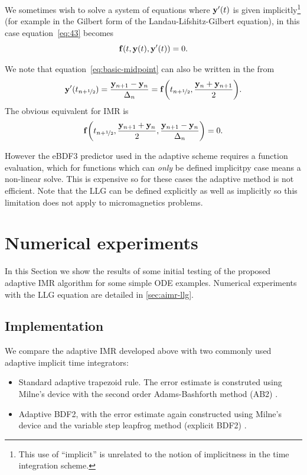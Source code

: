 We sometimes wish to solve a system of equations where $\mathbf{y}'(t)$ is given implicitly\footnote{This use of ``implicit'' is unrelated to the notion of implicitness in the time integration scheme.} (for example in the Gilbert form of the Landau-Lifshitz-Gilbert equation), in this case equation~\eqref{eq:43} becomes
\begin{equation}
  {\mathbf{f}{\left( t, \mathbf{y}(t), \mathbf{y}'(t) \right)}} = 0.
\end{equation}

We note that equation~\eqref{eq:basic-midpoint} can also be written in the from
\begin{equation}
  \mathbf{y}'(t_{n+\nicefrac{1}{2}}) = \frac{\mathbf{y}_{n+1} - \mathbf{y}_n}{\Delta_{n}} =  {\mathbf{f}{\left( t_{n+\nicefrac{1}{2}}, \frac{\mathbf{y}_n + \mathbf{y}_{n+1}}{2} \right)}}.
\end{equation}
The obvious equivalent for IMR is
\begin{equation}
  {\mathbf{f}{\left( t_{n+\nicefrac{1}{2}}, \frac{\mathbf{y}_{n+1} + \mathbf{y}_n}{2}, \frac{\mathbf{y}_{n+1} - \mathbf{y}_n}{\Delta_{n}} \right)}} = 0.
\end{equation}

However the eBDF3 predictor used in the adaptive scheme requires a function evaluation, which for functions which can \emph{only} be defined implicitpy case means a non-linear solve.
This is expensive so for these cases the adaptive method is not efficient.
Note that the LLG can be defined explicitly as well as implicitly so this limitation does not apply to micromagnetics problems.


\section{Numerical experiments}
\label{sec:aimr-testing}



In this Section we show the results of some initial testing of the proposed adaptive IMR algorithm for some simple ODE examples.
Numerical experiments with the LLG equation are detailed in \autoref{sec:aimr-llg}.


\subsection{Implementation}
\label{sec:aimr-implementation}

We compare the adaptive IMR developed above with two commonly used adaptive implicit time integrators:
\begin{itemize}
\item Standard adaptive trapezoid rule. 
  The error estimate is construted using Milne's device with the second order Adams-Bashforth method (AB2) \cite[707]{GreshoSani}.
\item Adaptive BDF2, with the error estimate again constructed using Milne's device and the variable step leapfrog method (\ie explicit BDF2) \cite[715]{GreshoSani}.
\end{itemize}

